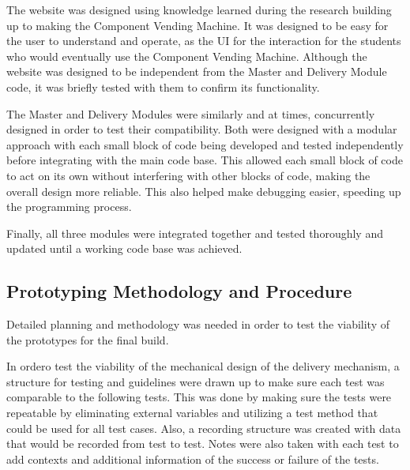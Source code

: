 \documentclass[a4paper,11pt]{article}
\numberwithin{figure}{section}
\numberwithin{table}{section}
\begin{document}
The website was designed using knowledge learned during the research building up to making the Component Vending Machine. It was designed to be easy for the user to understand and operate, as the UI for the interaction for the students who would eventually use the Component Vending Machine. Although the website was designed to be independent from the Master and Delivery Module code, it was briefly tested with them to confirm its functionality.

The Master and Delivery Modules were similarly and at times, concurrently designed in order to test their compatibility. Both were designed with a modular approach with each small block of code being developed and tested independently before integrating with the main code base. This allowed each small block of code to act on its own without interfering with other blocks of code, making the overall design more reliable. This also helped make debugging easier, speeding up the programming process.

Finally, all three modules were integrated together and tested thoroughly and updated until a working code base was achieved. 

\subsection[Prototyping Methodology and Procedure]{Prototyping Methodology and Procedure%
}

Detailed planning and methodology was needed in order to test the viability of the prototypes for the final build.

In ordero test the viability of the mechanical design of the delivery mechanism, a structure for testing and guidelines were drawn up to make sure each test was comparable to the following tests. This was done by making sure the tests were repeatable by eliminating external variables and utilizing a test method that could be used for all test cases. Also, a recording structure was created with data that would be recorded from test to test. Notes were also taken with each test to add contexts and additional information of the success or failure of the tests.

\newpage
\end{document}
